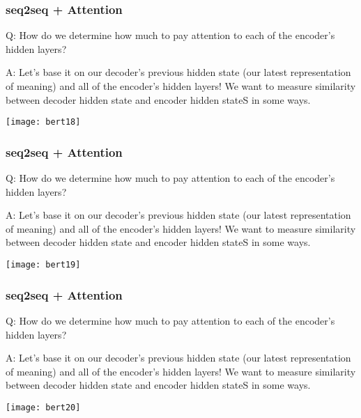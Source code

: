 \begin{frame}[fragile]\frametitle{seq2seq + Attention}

Q: How do we determine how much to pay attention to each of the encoder’s hidden layers? 

A: Let’s base it on our decoder’s previous hidden state (our latest representation of meaning) and all of the encoder’s hidden layers! We want to measure similarity between decoder hidden state and encoder hidden stateS in some ways. 



\begin{center}
\texttt{[image: bert18]}
\end{center}	

\end{frame}

\begin{frame}[fragile]\frametitle{seq2seq + Attention}

Q: How do we determine how much to pay attention to each of the encoder’s hidden layers? 

A: Let’s base it on our decoder’s previous hidden state (our latest representation of meaning) and all of the encoder’s hidden layers! We want to measure similarity between decoder hidden state and encoder hidden stateS in some ways. 



\begin{center}
\texttt{[image: bert19]}
\end{center}	

\end{frame}

\begin{frame}[fragile]\frametitle{seq2seq + Attention}

Q: How do we determine how much to pay attention to each of the encoder’s hidden layers? 

A: Let’s base it on our decoder’s previous hidden state (our latest representation of meaning) and all of the encoder’s hidden layers! We want to measure similarity between decoder hidden state and encoder hidden stateS in some ways. 



\begin{center}
\texttt{[image: bert20]}
\end{center}	

\end{frame}

